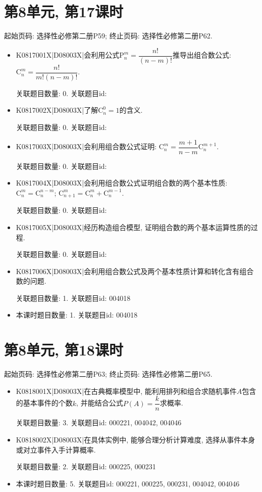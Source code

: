 \section*{第8单元, 第17课时}
起始页码: 选择性必修第二册P59; 终止页码: 选择性必修第二册P62.
\begin{itemize}
\item K0817001X|D08003X|会利用公式$\mathrm{P}_n^m=\dfrac{n!}{(n-m)!}$推导出组合数公式: $\mathrm{C}_n^m=\dfrac{n!}{m!(n-m)!}$.

关联题目数量: 0. 关联题目id: 

\item K0817002X|D08003X|了解$\mathrm{C}_n^0=1$的含义.

关联题目数量: 0. 关联题目id: 

\item K0817003X|D08003X|会利用组合数公式证明: $\mathrm{C}_n^m=\dfrac{m+1}{n-m}\mathrm{C}_n^{m+1}$.

关联题目数量: 0. 关联题目id: 

\item K0817004X|D08003X|会利用组合数公式证明组合数的两个基本性质: $\mathrm{C}_n^m=\mathrm{C}_n^{n-m}$; $\mathrm{C}_{n+1}^m=\mathrm{C}_n^m+\mathrm{C}_n^{m-1}$.

关联题目数量: 0. 关联题目id: 

\item K0817005X|D08003X|经历构造组合模型, 证明组合数的两个基本运算性质的过程.

关联题目数量: 0. 关联题目id: 

\item K0817006X|D08003X|会利用组合数公式及两个基本性质计算和转化含有组合数的问题.

关联题目数量: 1. 关联题目id: 004018

\item 本课时题目数量: 1. 关联题目id: 004018

\end{itemize}

\section*{第8单元, 第18课时}
起始页码: 选择性必修第二册P63; 终止页码: 选择性必修第二册P65.
\begin{itemize}
\item K0818001X|D08003X|在古典概率模型中, 能利用排列和组合求随机事件$A$包含的基本事件的个数$k$, 并能结合公式$P(A)=\dfrac kn$求概率.

关联题目数量: 3. 关联题目id: 000221, 004042, 004046

\item K0818002X|D08003X|在具体实例中, 能够合理分析计算难度, 选择从事件本身或对立事件入手计算概率.

关联题目数量: 2. 关联题目id: 000225, 000231

\item 本课时题目数量: 5. 关联题目id: 000221, 000225, 000231, 004042, 004046

\end{itemize}

